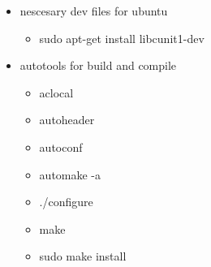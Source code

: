 \documentclass[11pt]{article}
\begin{document}
\begin{itemize}
\item nescesary dev files for ubuntu
\begin{itemize}
\item sudo apt-get install libcunit1-dev
\end{itemize}
\item autotools for build and compile
\begin{itemize}
\item aclocal
\item autoheader
\item autoconf
\item automake -a
\item ./configure
\item make
\item sudo make install
\end{itemize}
\end{itemize}
\end{document}
